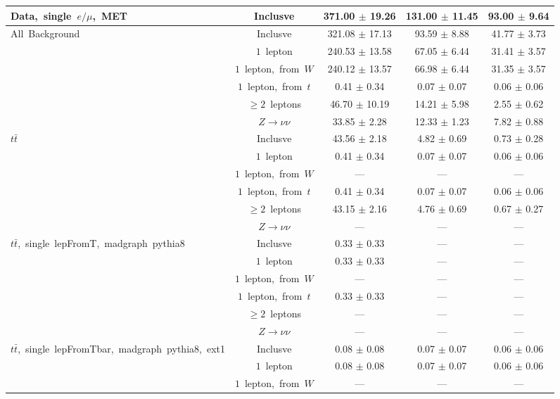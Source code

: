 \documentclass{article}
\begin{document}
\begin{longtable}{|l|c|c|c|c|}
\multirow{1}{*}{Data,~single~$e/\mu$,~MET} & Inclusve  & 371.00 $\pm$ 19.26  & 131.00 $\pm$ 11.45  & 93.00 $\pm$ 9.64 \\* 
\hline \hline 
\multirow{6}{*}{All~Background} & Inclusve  & 321.08 $\pm$ 17.13  & 93.59 $\pm$ 8.88  & 41.77 $\pm$ 3.73 \\* 
 & $1$~lepton  & 240.53 $\pm$ 13.58  & 67.05 $\pm$ 6.44  & 31.41 $\pm$ 3.57 \\* 
 & $1$~lepton,~from~$W$  & 240.12 $\pm$ 13.57  & 66.98 $\pm$ 6.44  & 31.35 $\pm$ 3.57 \\* 
 & $1$~lepton,~from~$t$  & 0.41 $\pm$ 0.34  & 0.07 $\pm$ 0.07  & 0.06 $\pm$ 0.06 \\* 
 & $\ge2$~leptons  & 46.70 $\pm$ 10.19  & 14.21 $\pm$ 5.98  & 2.55 $\pm$ 0.62 \\* 
 & $Z\rightarrow\nu\nu$  & 33.85 $\pm$ 2.28  & 12.33 $\pm$ 1.23  & 7.82 $\pm$ 0.88 \\* 
\hline 
\multirow{6}{*}{$t\bar{t}$} & Inclusve  & 43.56 $\pm$ 2.18  & 4.82 $\pm$ 0.69  & 0.73 $\pm$ 0.28 \\* 
 & $1$~lepton  & 0.41 $\pm$ 0.34  & 0.07 $\pm$ 0.07  & 0.06 $\pm$ 0.06 \\* 
 & $1$~lepton,~from~$W$  & ---  & ---  & --- \\* 
 & $1$~lepton,~from~$t$  & 0.41 $\pm$ 0.34  & 0.07 $\pm$ 0.07  & 0.06 $\pm$ 0.06 \\* 
 & $\ge2$~leptons  & 43.15 $\pm$ 2.16  & 4.76 $\pm$ 0.69  & 0.67 $\pm$ 0.27 \\* 
 & $Z\rightarrow\nu\nu$  & ---  & ---  & --- \\* 
\hline 
\multirow{6}{*}{$t\bar{t}$,~single~lepFromT,~madgraph~pythia8} & Inclusve  & 0.33 $\pm$ 0.33  & ---  & --- \\* 
 & $1$~lepton  & 0.33 $\pm$ 0.33  & ---  & --- \\* 
 & $1$~lepton,~from~$W$  & ---  & ---  & --- \\* 
 & $1$~lepton,~from~$t$  & 0.33 $\pm$ 0.33  & ---  & --- \\* 
 & $\ge2$~leptons  & ---  & ---  & --- \\* 
 & $Z\rightarrow\nu\nu$  & ---  & ---  & --- \\* 
\hline 
\multirow{6}{*}{$t\bar{t}$,~single~lepFromTbar,~madgraph~pythia8,~ext1} & Inclusve  & 0.08 $\pm$ 0.08  & 0.07 $\pm$ 0.07  & 0.06 $\pm$ 0.06 \\* 
 & $1$~lepton  & 0.08 $\pm$ 0.08  & 0.07 $\pm$ 0.07  & 0.06 $\pm$ 0.06 \\* 
 & $1$~lepton,~from~$W$  & ---  & ---  & --- \\* 

\end{longtable}
\end{document}
